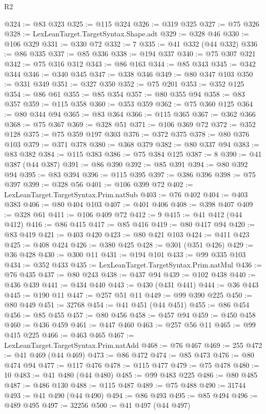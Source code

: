 \begin{lexlean}{R2}
\begin{coremodule}
@324 := @83 @323
@325 := @115 @324
@326 := @319 @325
@327 := @75 @326
@328 := LexLeanTarget.TargetSyntax.Shape.adt
@329 := @328 @46
@330 := @106 @329
@331 := @330 @72
@332 := 7
@335 := @41 @332 (@44 @332)
@336 := @86 @335
@337 := @85 @336
@338 := @194 @337
@340 := @75 @307 @321
@342 := @75 @316 @312
@343 := @86 @163
@344 := @85 @343
@345 := @342 @344
@346 := @340 @345
@347 := @338 @346
@349 := @80 @347 @103
@350 := @331 @349
@351 := @327 @350
@352 := @75 @201
@353 := @352 @125
@354 := @86 @61
@355 := @85 @354
@357 := @80 @355 @94
@358 := @83 @357
@359 := @115 @358
@360 := @353 @359
@362 := @75 @360 @125
@364 := @80 @344 @94
@365 := @83 @364
@366 := @115 @365
@367 := @362 @366
@368 := @75 @367
@369 := @328 @51
@371 := @106 @369 @72
@372 := @352 @128
@375 := @75 @359 @197 @303
@376 := @372 @375
@378 := @80 @376 @103
@379 := @371 @378
@380 := @368 @379
@382 := @80 @337 @94
@383 := @83 @382
@384 := @115 @383
@386 := @75 @384 @125
@387 := 8
@390 := @41 @387 (@44 @387)
@391 := @86 @390
@392 := @85 @391
@394 := @80 @392 @94
@395 := @83 @394
@396 := @115 @395
@397 := @386 @396
@398 := @75 @397
@399 := @328 @56
@401 := @106 @399 @72
@402 := LexLeanTarget.TargetSyntax.Prim.natSub
@403 := @76 @402
@404 := @403 @383
@406 := @80 @404 @103
@407 := @401 @406
@408 := @398 @407
@409 := @328 @61
@411 := @106 @409 @72
@412 := 9
@415 := @41 @412 (@44 @412)
@416 := @86 @415
@417 := @85 @416
@419 := @80 @417 @94
@420 := @83 @419
@421 := @403 @420
@423 := @80 @421 @103
@424 := @411 @423
@425 := @408 @424
@426 := @380 @425
@428 := @301 (@351 @426)
@429 := @36 @428
@430 := @300 @11
@431 := @194 @101
@433 := @99 @335 @103
@434 := @352 @433
@435 := LexLeanTarget.TargetSyntax.Prim.natMul
@436 := @76 @435
@437 := @80 @243
@438 := @437 @94
@439 := @102 @438
@440 := @436 @439
@441 := @434 @440
@443 := @430 (@431 @441)
@444 := @36 @443
@445 := @190 @11
@447 := @257 @51 @11
@449 := @99 @390 @225
@450 := @80 @449
@451 := 32768
@454 := @41 @451 (@44 @451)
@455 := @86 @454
@456 := @85 @455
@457 := @80 @456
@458 := @457 @94
@459 := @450 @458
@460 := @436 @459
@461 := @447 @460
@463 := @257 @56 @11
@465 := @99 @415 @225
@466 := @463 @465
@467 := LexLeanTarget.TargetSyntax.Prim.natAdd
@468 := @76 @467
@469 := 255
@472 := @41 @469 (@44 @469)
@473 := @86 @472
@474 := @85 @473
@476 := @80 @474 @94
@477 := @117 @476
@478 := @115 @477
@479 := @75 @478
@480 := 10
@483 := @41 @480 (@44 @480)
@485 := @99 @483 @225
@486 := @80 @485
@487 := @486 @130
@488 := @115 @487
@489 := @75 @488
@490 := 31744
@493 := @41 @490 (@44 @490)
@494 := @86 @493
@495 := @85 @494
@496 := @489 @495
@497 := 32256
@500 := @41 @497 (@44 @497)

\end{coremodule}
\end{lexlean}
